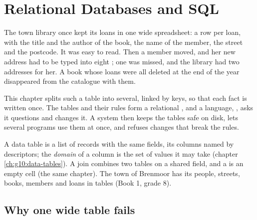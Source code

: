 \chapter{Relational Databases and SQL}\label{ch:g12:relational-databases-sql}

The town library once kept its loans in one wide spreadsheet: a row per loan, with the title and the author of the
book, the name of the member, the street and the postcode. It was easy to read. Then a member moved, and her new
address had to be typed into eight ; one was missed, and the library had two addresses for her. A book whose
loans were all deleted at the end of the year disappeared from the catalogue with them.

This chapter splits such a table into several, linked by keys, so that each fact is written once. The tables and
their rules form a relational , and a language, , asks it questions and changes it. A  system
then keeps the tables safe on disk, lets several programs use them at once, and refuses changes that break the rules.

\begin{recall}
A data table is a list of records with the same fields, its columns named by descriptors; the \emph{domain} of a
column is the set of values it may take (chapter \ref{ch:g10:data-tables}). A join combines two tables on a shared
field, and a  is an empty cell (the same chapter). The town of Brenmoor has its people, streets, books,
members and loans in tables (Book 1, grade 8).
\end{recall}

\section{Why one wide table fails}\label{sec:g12:relational-databases-sql:flat}

